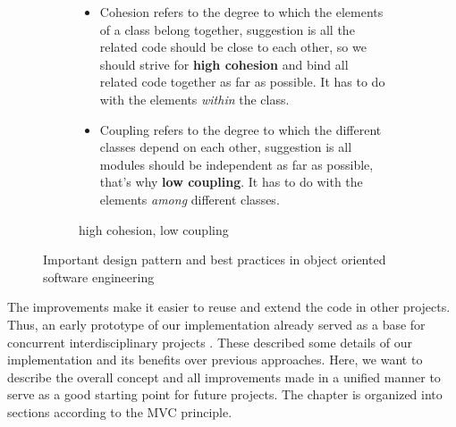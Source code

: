 \begin{figure}
\begin{subfigure}[b]{0.68\textwidth}
\begin{small}
\begin{ssfont}
\begin{itemize}
\item Cohesion refers to the degree to which the elements of a class belong together, suggestion is all the related code should be close to each other, so we should strive for \textbf{high cohesion} and bind all related code together as far as possible. It has to do with the elements \textit{within} the class. %
\item Coupling refers to the degree to which the different classes depend on each other, suggestion is all modules should be independent as far as possible, that's why \textbf{low coupling}. It has to do with the elements \textit{among} different classes. %
\end{itemize}
\end{ssfont}
\end{small}
\caption{high cohesion, low coupling\footnotemark}
\label{fig:coh}
\end{subfigure}
\caption{Important design pattern and best practices in object oriented software engineering}
\label{fig:patterns}
\end{figure}

%

The improvements make it easier to reuse and extend the code in other projects. Thus, an early prototype of our implementation already served as a base for concurrent interdisciplinary projects \cite{fischer2016idp,feil2016idp}. These described some details of our implementation and its benefits over previous approaches. Here, we want to describe the overall concept and all improvements made in a unified manner to serve as a good starting point for future projects. The chapter is organized into sections according to the MVC principle.

